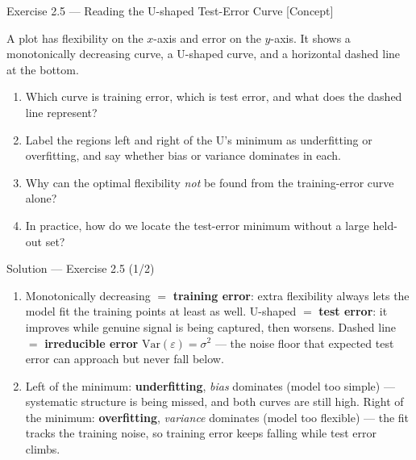 \documentclass[aspectratio=169,11pt]{beamer}
\begin{document}
\begin{frame}{Exercise 2.5 --- Reading the U-shaped Test-Error Curve [Concept]}
\begin{exercise}
A plot has flexibility on the $x$-axis and error on the $y$-axis. It
shows a monotonically decreasing curve, a U-shaped curve, and a
horizontal dashed line at the bottom.
\begin{enumerate}
  \item Which curve is training error, which is test error, and what
        does the dashed line represent?
  \item Label the regions left and right of the U's minimum as
        underfitting or overfitting, and say whether bias or variance
        dominates in each.
  \item Why can the optimal flexibility \emph{not} be found from the
        training-error curve alone?
  \item In practice, how do we locate the test-error minimum without a
        large held-out set?
\end{enumerate}
\end{exercise}
\end{frame}

\begin{frame}{Solution --- Exercise 2.5 (1/2)}
\begin{solutionbox}
\begin{enumerate}
  \item Monotonically decreasing $=$ \textbf{training error}: extra
        flexibility always lets the model fit the training points at
        least as well. U-shaped $=$ \textbf{test error}: it improves
        while genuine signal is being captured, then worsens. Dashed
        line $=$ \textbf{irreducible error}
        $\mathrm{Var}(\varepsilon)=\sigma^2$ --- the noise floor that
        expected test error can approach but never fall below.
  \item Left of the minimum: \textbf{underfitting}, \emph{bias}
        dominates (model too simple) --- systematic structure is being
        missed, and both curves are still high. Right of the minimum:
        \textbf{overfitting}, \emph{variance} dominates (model too
        flexible) --- the fit tracks the training noise, so training
        error keeps falling while test error climbs.
\end{enumerate}
\end{solutionbox}
\end{frame}
\end{document}
